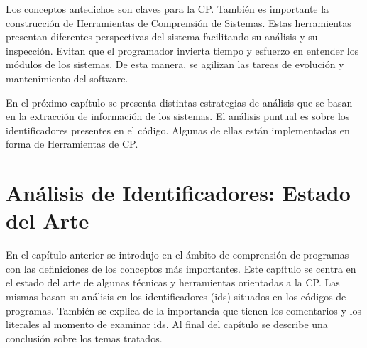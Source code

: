 \documentclass[a4paper,12pt]{report}
\begin{document}



Los conceptos antedichos son claves para la CP. También es importante la construcción de Herramientas de Comprensión de Sistemas. Estas herramientas presentan diferentes perspectivas del sistema facilitando su análisis y su inspección. Evitan que el programador invierta tiempo y esfuerzo en entender los módulos de los sistemas. De esta manera, se agilizan las tareas de evolución y mantenimiento del software.

En el próximo capítulo se presenta distintas estrategias de análisis que se basan en la extracción de información de los sistemas. El análisis puntual es sobre los identificadores presentes en el código. Algunas de ellas están implementadas en forma de Herramientas de CP.




\chapter{Análisis de Identificadores: Estado del Arte}


En el capítulo anterior se introdujo en el ámbito de comprensión de programas con las definiciones de los conceptos más importantes. Este capítulo se centra en el estado del arte de algunas técnicas y herramientas orientadas a la CP. Las mismas basan su análisis en los identificadores (ids) situados en los códigos de programas. También se explica de la importancia que tienen los comentarios y los literales al momento de examinar ids. Al final del capítulo se describe una conclusión sobre los temas tratados.
\end{document}
